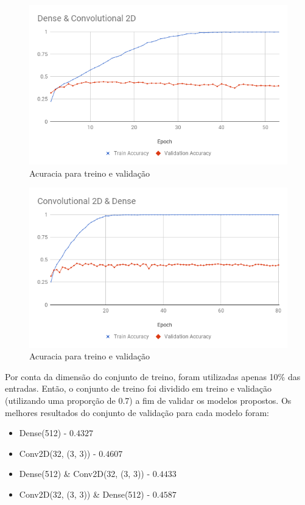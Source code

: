 \documentclass[conference]{IEEEtran}
\begin{document}
\begin{figure}[h!]
	\includegraphics[scale=0.4]{dense_conv.png}
	\caption{Acuracia para treino e validação}
	\label{fig:dense_conv}
\end{figure}

\begin{figure}[h!]
	\includegraphics[scale=0.4]{conv_dense.png}
	\caption{Acuracia para treino e validação}
	\label{fig:conv_dense}
\end{figure}

Por conta da dimensão do conjunto de treino, foram utilizadas apenas 10\% das entradas. Então, o conjunto de treino foi dividido em treino e validação (utilizando uma proporção de 0.7) a fim de validar os modelos propostos. Os melhores resultados do conjunto de validação para cada modelo foram: 

\begin{itemize}
	\item Dense(512) - $0.4327$
	\item Conv2D(32, (3, 3)) - $0.4607$
	\item Dense(512) \& Conv2D(32, (3, 3)) - $0.4433$
	\item Conv2D(32, (3, 3)) \& Dense(512) - $0.4587$
\end{itemize}
\end{document}
